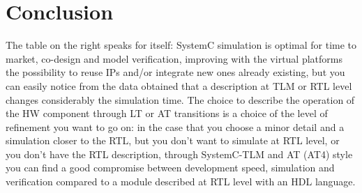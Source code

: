 \documentclass[]{IEEEtran}
\begin{document}
	\section{Conclusion}
	The table on the right speaks for itself: SystemC simulation is optimal for time to market, co-design and model verification, improving with the virtual platforms the possibility to reuse IPs and/or integrate new ones already existing, but you can easily notice from the data obtained that a description at TLM or RTL level changes considerably the simulation time.
	The choice to describe the operation of the HW component through LT or AT transitions is a choice of the level of refinement you want to go on: in the case that you choose a minor detail and a simulation closer to the RTL, but you don't want to simulate at RTL level, or you don't have the RTL description, through SystemC-TLM and AT (AT4) style you can find a good compromise between development speed, simulation and verification compared to a module described at RTL level with an HDL language.
	
	
	
\end{document}
